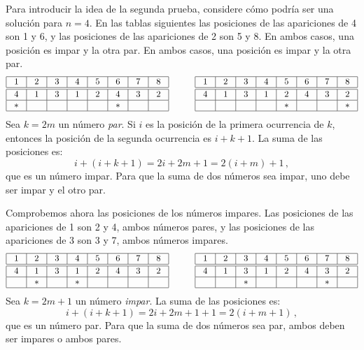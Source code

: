 Para introducir la idea de la segunda prueba, considere cómo podría ser una solución para $n=4$. En las tablas siguientes las posiciones de las apariciones de 4 son 1 y 6, y las posiciones de las apariciones de 2 son 5 y 8. En ambos casos, una posición es impar y la otra par. En ambos casos, una posición es impar y la otra par. 
\[
\addtolength{\arraycolsep}{4pt}
\begin{array}{|c|c|c|c|c|c|c|c|}
\hline
1&2&3&4&5&6&7&8\\
\hline\hline
4&1&3&1&2&4&3&2\\\hline
*&&&&&*&&\\\hline
\end{array}
\hspace{3em}
\begin{array}{|c|c|c|c|c|c|c|c|}
\hline
1&2&3&4&5&6&7&8\\
\hline\hline
4&1&3&1&2&4&3&2\\\hline
&&&&*&&&*\\\hline
\end{array}
\]
Sea $k=2m$ un número \emph{par}. Si $i$ es la posición de la primera ocurrencia de $k$, entonces la posición de la segunda ocurrencia es $i+k+1$.
La suma de las posiciones es:
\[
i+(i+k+1)=2i+2m+1=2(i+m)+1\,,
\]
que es un número impar. Para que la suma de dos números sea impar, uno debe ser impar y el otro par.

Comprobemos ahora las posiciones de los números impares. Las posiciones de las apariciones de 1 son 2 y 4, ambos números pares, y las posiciones de las apariciones de 3 son 3 y 7, ambos números impares.
\[
\addtolength{\arraycolsep}{4pt}
\begin{array}{|c|c|c|c|c|c|c|c|}
\hline
1&2&3&4&5&6&7&8\\
\hline\hline
4&1&3&1&2&4&3&2\\\hline
&*&&*&&&&\\\hline
\end{array}
\hspace{3em}
\begin{array}{|c|c|c|c|c|c|c|c|}
\hline
1&2&3&4&5&6&7&8\\
\hline\hline
4&1&3&1&2&4&3&2\\\hline
&&*&&&&*&\\\hline
\end{array}
\]
Sea $k=2m+1$ un número \emph{impar}. La suma de las posiciones es:
\[
i+(i+k+1)=2i+2m+1+1=2(i+m+1)\,,
\]
que es un número par. Para que la suma de dos números sea par, ambos deben ser impares o ambos pares.

